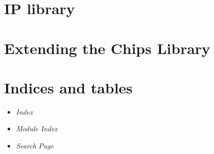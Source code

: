 \documentclass[letterpaper,10pt,english]{manual}
\begin{document}
\chapter{IP library}
\hypertarget{module-chips.ip}{}
\modulesynopsis{}
\resetcurrentobjects
\hypertarget{--doc-extending\_chips/index}{}

\chapter{Extending the Chips Library}


\chapter{Indices and tables}
\begin{itemize}
\item {} 
\emph{Index}

\item {} 
\emph{Module Index}

\item {} 
\emph{Search Page}

\end{itemize}


\renewcommand{\indexname}{Module Index}
\printmodindex
\renewcommand{\indexname}{Index}
\printindex
\end{document}
